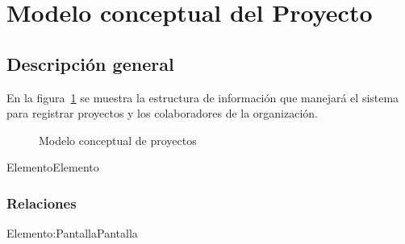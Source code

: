 \section{Modelo conceptual del Proyecto}
\subsection{Descripción general}
 En la figura~\ref{fig:modeloConceptualProyectos} se muestra la estructura de información que manejará el sistema para registrar proyectos 
 y los colaboradores de la organización.
 
\begin{figure}[htbp!]
	\begin{center}
		\caption{Modelo conceptual de proyectos}
		\label{fig:modeloConceptualProyectos}
	\end{center}
\end{figure}


\begin{BusinessEntity}{Elemento}{Elemento}
\end{BusinessEntity}

\subsubsection{Relaciones}

\begin{BusinessFact}{Elemento:Pantalla}{Pantalla}
\end{BusinessFact}

